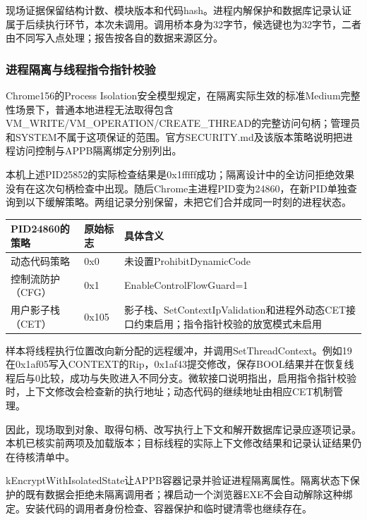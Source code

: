 \documentclass[UTF8,a4paper,zihao=5,fontset=windows]{ctexart}
\newcommand{\code}[1]{{\ttfamily\small #1}}
\begin{document}
现场证据保留结构计数、模块版本和代码hash。进程内解保护和数据库记录认证属于后续执行环节，本次未调用。调用桥本身为32字节，候选键也为32字节，二者由不同写入点处理；报告按各自的数据来源区分。

\subsubsection{进程隔离与线程指令指针校验}
Chrome156的Process Isolation安全模型规定，在隔离实际生效的标准Medium完整性场景下，普通本地进程无法取得包含\code{VM\_WRITE/VM\_OPERATION/CREATE\_THREAD}的完整访问句柄；管理员和SYSTEM不属于这项保证的范围。官方\code{SECURITY.md}及该版本策略说明把进程访问控制与APPB隔离绑定分别列出。\cite{isolationsecurity156,isolationpolicy156}

本机上述PID\code{25852}的实际检查结果是\code{0x1fffff}成功；隔离设计中的全访问拒绝效果没有在这次句柄检查中出现。随后Chrome主进程PID变为\code{24860}，在新PID单独查询到以下缓解策略。两组记录分别保留，未把它们合并成同一时刻的进程状态。

\begin{longtable}{@{}L{48mm}L{20mm}L{82mm}@{}}\toprule PID24860的策略 & 原始标志 & 具体含义\\\midrule\endhead
动态代码策略 & \code{0x0} & 未设置\code{ProhibitDynamicCode}\\
控制流防护（CFG） & \code{0x1} & \code{EnableControlFlowGuard=1}\\
用户影子栈（CET） & \code{0x105} & 影子栈、\code{SetContextIpValidation}和进程外动态CET接口约束启用；指令指针校验的放宽模式未启用\\\bottomrule\end{longtable}

样本将线程执行位置改向新分配的远程缓冲，并调用\code{SetThreadContext}。例如19在\code{0x1af05}写入CONTEXT的\code{Rip}，\code{0x1af43}提交修改，保存BOOL结果并在恢复线程后与0比较，成功与失败进入不同分支。微软接口说明指出，启用指令指针校验时，上下文修改会检查新的执行地址；动态代码的继续地址由相应CET机制管理。\cite{shadowstackpolicy,dynamicehcont}

因此，现场取到对象、取得句柄、改写执行上下文和解开数据库记录应逐项记录。本机已核实前两项及加载版本；目标线程的实际上下文修改结果和记录认证结果仍在待核清单中。

\code{kEncryptWithIsolatedState}让APPB容器记录并验证进程隔离属性。隔离状态下保护的既有数据会拒绝未隔离调用者；裸启动一个浏览器EXE不会自动解除这种绑定。安装代码的调用者身份检查、容器保护和临时键清零也继续存在。\cite{caller156,appbound156,encryptortraits156}
\end{document}
